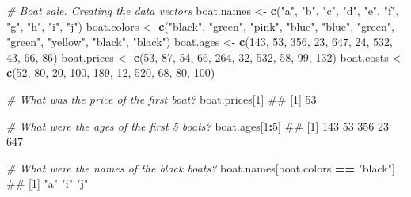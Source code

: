 \documentclass[]{book}
\newenvironment{Shaded}{\begin{snugshade}}{\end{snugshade}}
\newcommand{\KeywordTok}[1]{\textcolor[rgb]{0.13,0.29,0.53}{\textbf{#1}}}
\newcommand{\DecValTok}[1]{\textcolor[rgb]{0.00,0.00,0.81}{#1}}
\newcommand{\StringTok}[1]{\textcolor[rgb]{0.31,0.60,0.02}{#1}}
\newcommand{\CommentTok}[1]{\textcolor[rgb]{0.56,0.35,0.01}{\textit{#1}}}
\newcommand{\OperatorTok}[1]{\textcolor[rgb]{0.81,0.36,0.00}{\textbf{#1}}}
\newcommand{\NormalTok}[1]{#1}
\theoremstyle{definition}
\theoremstyle{definition}
\theoremstyle{remark}
\begin{document}
\begin{Shaded}
\begin{Highlighting}[]
\CommentTok{# Boat sale. Creating the data vectors}
\NormalTok{boat.names <-}\StringTok{ }\KeywordTok{c}\NormalTok{(}\StringTok{"a"}\NormalTok{, }\StringTok{"b"}\NormalTok{, }\StringTok{"c"}\NormalTok{, }\StringTok{"d"}\NormalTok{, }\StringTok{"e"}\NormalTok{, }\StringTok{"f"}\NormalTok{, }\StringTok{"g"}\NormalTok{, }\StringTok{"h"}\NormalTok{, }\StringTok{"i"}\NormalTok{, }\StringTok{"j"}\NormalTok{)}
\NormalTok{boat.colors <-}\StringTok{ }\KeywordTok{c}\NormalTok{(}\StringTok{"black"}\NormalTok{, }\StringTok{"green"}\NormalTok{, }\StringTok{"pink"}\NormalTok{, }\StringTok{"blue"}\NormalTok{, }\StringTok{"blue"}\NormalTok{, }
                \StringTok{"green"}\NormalTok{, }\StringTok{"green"}\NormalTok{, }\StringTok{"yellow"}\NormalTok{, }\StringTok{"black"}\NormalTok{, }\StringTok{"black"}\NormalTok{)}
\NormalTok{boat.ages <-}\StringTok{ }\KeywordTok{c}\NormalTok{(}\DecValTok{143}\NormalTok{, }\DecValTok{53}\NormalTok{, }\DecValTok{356}\NormalTok{, }\DecValTok{23}\NormalTok{, }\DecValTok{647}\NormalTok{, }\DecValTok{24}\NormalTok{, }\DecValTok{532}\NormalTok{, }\DecValTok{43}\NormalTok{, }\DecValTok{66}\NormalTok{, }\DecValTok{86}\NormalTok{)}
\NormalTok{boat.prices <-}\StringTok{ }\KeywordTok{c}\NormalTok{(}\DecValTok{53}\NormalTok{, }\DecValTok{87}\NormalTok{, }\DecValTok{54}\NormalTok{, }\DecValTok{66}\NormalTok{, }\DecValTok{264}\NormalTok{, }\DecValTok{32}\NormalTok{, }\DecValTok{532}\NormalTok{, }\DecValTok{58}\NormalTok{, }\DecValTok{99}\NormalTok{, }\DecValTok{132}\NormalTok{)}
\NormalTok{boat.costs <-}\StringTok{ }\KeywordTok{c}\NormalTok{(}\DecValTok{52}\NormalTok{, }\DecValTok{80}\NormalTok{, }\DecValTok{20}\NormalTok{, }\DecValTok{100}\NormalTok{, }\DecValTok{189}\NormalTok{, }\DecValTok{12}\NormalTok{, }\DecValTok{520}\NormalTok{, }\DecValTok{68}\NormalTok{, }\DecValTok{80}\NormalTok{, }\DecValTok{100}\NormalTok{)}

\CommentTok{# What was the price of the first boat?}
\NormalTok{boat.prices[}\DecValTok{1}\NormalTok{]}
\NormalTok{## [1] 53}

\CommentTok{# What were the ages of the first 5 boats?}
\NormalTok{boat.ages[}\DecValTok{1}\OperatorTok{:}\DecValTok{5}\NormalTok{]}
\NormalTok{## [1] 143  53 356  23 647}

\CommentTok{# What were the names of the black boats?}
\NormalTok{boat.names[boat.colors }\OperatorTok{==}\StringTok{ "black"}\NormalTok{]}
\NormalTok{## [1] "a" "i" "j"}


\end{Highlighting}
\end{Shaded}
\end{document}

